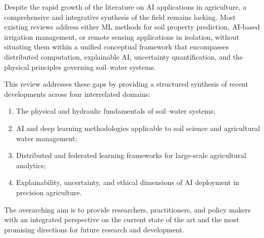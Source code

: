 \documentclass[land,review,accept,pdftex,oneauthor]{Definitions/mdpi}
\begin{document}
Despite the rapid growth of the literature on AI applications in agriculture, a comprehensive and integrative synthesis of the field remains lacking. Most existing reviews address either ML methods for soil property prediction, AI-based irrigation management, or remote sensing applications in isolation, without situating them within a unified conceptual framework that encompasses distributed computation, explainable AI, uncertainty quantification, and the physical principles governing soil--water systems. 

This review addresses these gaps by providing a structured synthesis of recent developments across four interrelated domains: 
\begin{enumerate}[label=(\roman*)]
    \item The physical and hydraulic fundamentals of soil--water systems;
    \item AI and deep learning methodologies applicable to soil science and agricultural water management;
    \item Distributed and federated learning frameworks for large-scale agricultural analytics;
    \item Explainability, uncertainty, and ethical dimensions of AI deployment in precision agriculture.
\end{enumerate}

The overarching aim is to provide researchers, practitioners, and policy makers with an integrated perspective on the current state of the art and the most promising directions for future research and development.
\end{document}
